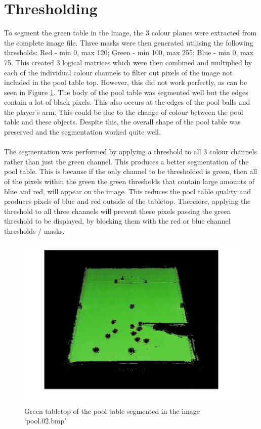 \documentclass[11pt]{article}
\begin{document}
\newpage

\section{Thresholding}
To segment the green table in the image, the 3 colour planes were extracted from the complete image file. Three masks were then generated utilising the following thresholds: Red - min 0, max 120; Green - min 100, max 255; Blue - min 0, max 75. This created 3 logical matrices which were then combined and multiplied by each of the individual colour channels to filter out pixels of the image not included in the pool table top. However, this did not work perfectly, as can be seen in Figure \ref{newpool}. The body of the pool table was segmented well but the edges contain a lot of black pixels. This also occurs at the edges of the pool balls and the player's arm. This could be due to the change of colour between the pool table and these objects. Despite this, the overall shape of the pool table was preserved and the segmentation worked quite well. \\
\\
The segmentation was performed by applying a threshold to all 3 colour channels rather than just the green channel. This produces a better segmentation of the pool table. This is because if the only channel to be thresholded is green, then all of the pixels within the green the green thresholds that contain large amounts of blue and red, will appear on the image. This reduces the pool table quality and produces pixels of blue and red outside of the tabletop. Therefore, applying the threshold to all three channels will prevent these pixels passing the green threshold to be displayed, by blocking them with the red or blue channel thresholds / masks.

\begin{figure}[H]
\centering
\includegraphics[width = \linewidth]{newpool.jpg}
\caption{Green tabletop of the pool table segmented in the image `pool.02.bmp'}
\label{newpool}
\end{figure}
\end{document}

